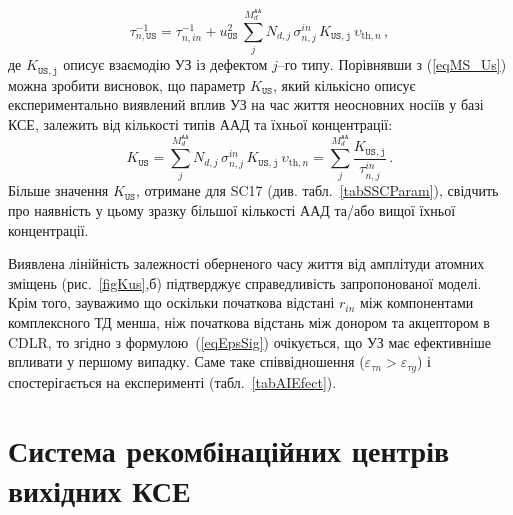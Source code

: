 \begin{equation}
\tau_{n,\mathtt{US}}^{-1}=\tau_{n,in}^{-1}+
u_{\mathtt{US}}^2\,\sum_j^{M_d^\mathtt{AA}}N_{d,j}\,\sigma_{n,j}^{in}\,K_\mathtt{US,j}\,\upsilon_{\mathrm{th},n}\,,
\end{equation}
де $K_\mathtt{US,j}$ описує взаємодію УЗ із дефектом $j$--го типу.
Порівнявши з (\ref{eqMS_Us}) можна зробити висновок, що параметр $K_\mathtt{US}$, який кількісно описує експериментально виявлений вплив УЗ на час життя неосновних носіїв у базі КСЕ,
залежить від кількості типів ААД та їхньої концентрації:
\begin{equation}
\label{eqKUS}
K_\mathtt{US}=\sum_j^{M_d^\mathtt{AA}}N_{d,j}\,\sigma_{n,j}^{in}\,K_\mathtt{US,j}\,\upsilon_{\mathrm{th},n}=\sum_j^{M_d^\mathtt{AA}}\frac{K_\mathtt{US,j}}{\tau_{n,j}^{in}}\,.
\end{equation}
Більше значення $K_\mathtt{US}$, отримане для SC17 (див. табл.~\ref{tabSSCParam}), свідчить про наявність у цьому зразку більшої кількості ААД та/або вищої їхньої концентрації.

Виявлена лінійність залежності оберненого часу життя від амплітуди атомних зміщень (рис.~\ref{figKus},б) підтверджує
справедливість запропонованої моделі.
Крім того, зауважимо що оскільки початкова відстані $r_{in}$ між компонентами комплексного ТД  менша, ніж початкова відстань між донором та акцептором в CDLR,
то згідно з формулою~(\ref{eqEpsSig}) очікується, що УЗ має ефективніше впливати у першому випадку.
Саме таке співвідношення ($\varepsilon_{\tau n}>\varepsilon_{\tau g}$) і спостерігається на експерименті (табл.~\ref{tabAIEfect}).







\section{Система рекомбінаційних центрів вихідних КСЕ\label{sBulyrMethod}}

